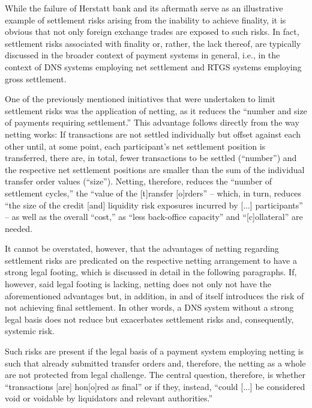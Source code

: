 While the failure of Herstatt bank and its aftermath serve as an illustrative example of settlement risks arising from the inability to achieve finality, it is obvious that not only foreign exchange trades are exposed to such risks.
In fact, settlement risks associated with finality or, rather, the lack thereof, are typically discussed in the broader context of payment systems in general, i.e., in the context of DNS systems employing net settlement and RTGS systems employing gross settlement.

One of the previously mentioned initiatives that were undertaken to limit settlement risks was the application of netting, as it reduces the ``number and size of payments requiring settlement.'' \autocite[59]{galati2002}
This advantage follows directly from the way netting works:
If transactions are not settled individually but offset against each other until, at some point, each participant's net settlement position is transferred, there are, in total, fewer transactions to be settled (``number'') and the respective net settlement positions are smaller than the sum of the individual transfer order values (``size'').
Netting, therefore, reduces the ``number of settlement cycles,'' the ``value of the [t]ransfer [o]rders'' -- which, in turn, reduces ``the size of the credit [and] liquidity risk exposures incurred by [...] participants'' -- as well as the overall ``cost,'' as ``less back-office capacity'' and ``[c]ollateral'' are needed. \autocite[40]{vereecken2003}

It cannot be overstated, however, that the advantages of netting regarding settlement risks are predicated on the respective netting arrangement to have a strong legal footing, which is discussed in detail in the following paragraphs.
If, however, said legal footing is lacking, netting does not only not have the aforementioned advantages but, in addition, in and of itself introduces the risk of not achieving final settlement.
In other words, a DNS system without a strong legal basis does not reduce but exacerbates settlement risks and, consequently, systemic risk.

Such risks are present if the legal basis of a payment system employing netting is such that already submitted transfer orders and, therefore, the netting as a whole are not protected from legal challenge.
The central question, therefore, is whether ``transactions [are] hon[o]red as final'' or if they, instead, ``could [...] be considered void or voidable by liquidators and relevant authorities.'' \autocite[16]{bis2016cpmiglossary}

